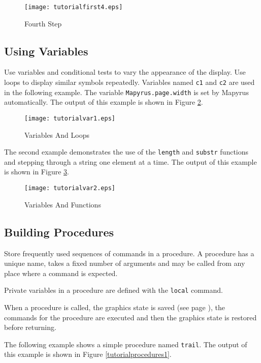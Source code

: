 \begin{figure}[htb]
\texttt{[image: tutorialfirst4.eps]}
\caption{Fourth Step}
\label{tutorialfirst4}
\end{figure}

\subsection{Using Variables}

Use variables and conditional tests to vary the appearance
of the display.
Use loops to display similar symbols repeatedly.
Variables named \texttt{c1} and \texttt{c2} are used in the
following example.  The variable
\texttt{Mapyrus.page.width}
is set by Mapyrus automatically.
The output of this example is shown in Figure \ref{tutorialvar1}.



\begin{figure}[htb]
\texttt{[image: tutorialvar1.eps]}
\caption{Variables And Loops}
\label{tutorialvar1}
\end{figure}

The second example demonstrates the use of the
\texttt{length} and \texttt{substr}
functions
and stepping through a string one element at a time.
The output of this example is shown in Figure \ref{tutorialvar2}.



\begin{figure}[htb]
\texttt{[image: tutorialvar2.eps]}
\caption{Variables And Functions}
\label{tutorialvar2}
\end{figure}


\subsection{Building Procedures}

Store frequently used sequences of commands in a procedure.
A procedure has a unique name, takes a fixed number of arguments and
may be called from any place where a command is expected.

Private variables in a procedure are defined with the 
\texttt{local} command.

When a procedure is called, the graphics state
is saved (see page \pageref{graphicsstate}),
the commands for the procedure are executed and then the
graphics state is restored before returning.

The following example shows a simple procedure named \texttt{trail}.
The output of this example is shown in Figure \ref{tutorialprocedures1}.

